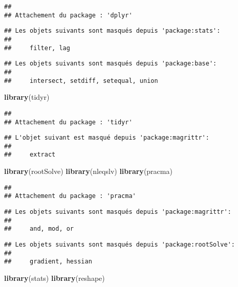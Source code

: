 \documentclass[
]{article}
\newenvironment{Shaded}{\begin{snugshade}}{\end{snugshade}}
\newcommand{\FunctionTok}[1]{\textcolor[rgb]{0.13,0.29,0.53}{\textbf{#1}}}
\newcommand{\NormalTok}[1]{#1}
\begin{document}
\begin{verbatim}
## 
## Attachement du package : 'dplyr'
\end{verbatim}

\begin{verbatim}
## Les objets suivants sont masqués depuis 'package:stats':
## 
##     filter, lag
\end{verbatim}

\begin{verbatim}
## Les objets suivants sont masqués depuis 'package:base':
## 
##     intersect, setdiff, setequal, union
\end{verbatim}

\begin{Shaded}
\begin{Highlighting}[]
\FunctionTok{library}\NormalTok{(tidyr)}
\end{Highlighting}
\end{Shaded}

\begin{verbatim}
## 
## Attachement du package : 'tidyr'
\end{verbatim}

\begin{verbatim}
## L'objet suivant est masqué depuis 'package:magrittr':
## 
##     extract
\end{verbatim}

\begin{Shaded}
\begin{Highlighting}[]
\FunctionTok{library}\NormalTok{(rootSolve)}
\FunctionTok{library}\NormalTok{(nleqslv)}
\FunctionTok{library}\NormalTok{(pracma)}
\end{Highlighting}
\end{Shaded}

\begin{verbatim}
## 
## Attachement du package : 'pracma'
\end{verbatim}

\begin{verbatim}
## Les objets suivants sont masqués depuis 'package:magrittr':
## 
##     and, mod, or
\end{verbatim}

\begin{verbatim}
## Les objets suivants sont masqués depuis 'package:rootSolve':
## 
##     gradient, hessian
\end{verbatim}

\begin{Shaded}
\begin{Highlighting}[]
\FunctionTok{library}\NormalTok{(stats)}
\FunctionTok{library}\NormalTok{(reshape)}
\end{Highlighting}
\end{Shaded}
\end{document}
